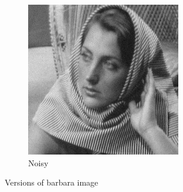 \documentclass[12pt]{article}
\begin{document}
\begin{figure}[h]
\begin{subfigure}[b]{0.3\textwidth}
        \includegraphics[width=\textwidth]{../images/noisy_barbara256.png}
        \caption{Noisy }
        \label{fig:subfig2}
    \end{subfigure}
    \caption{Versions of barbara image}
    \label{fig:overall}
\end{figure}
\end{document}
